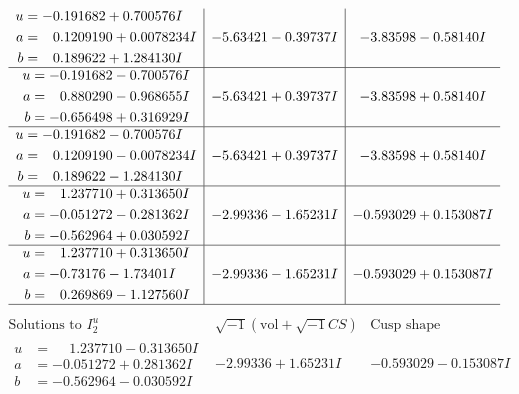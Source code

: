 \documentclass[1p]{elsarticle_modified}
\theoremstyle{definition}
\newcommand{\I}{\sqrt{-1}}
\begin{document}
$$\begin{array}{c|c|c}
\begin{aligned}
u &= -0.191682 + 0.700576 I \\
a &= \phantom{-}0.1209190 + 0.0078234 I \\
b &= \phantom{-}0.189622 + 1.284130 I\end{aligned}
 & -5.63421 - 0.39737 I & -3.83598 - 0.58140 I \\ \hline\begin{aligned}
u &= -0.191682 - 0.700576 I \\
a &= \phantom{-}0.880290 - 0.968655 I \\
b &= -0.656498 + 0.316929 I\end{aligned}
 & -5.63421 + 0.39737 I & -3.83598 + 0.58140 I \\ \hline\begin{aligned}
u &= -0.191682 - 0.700576 I \\
a &= \phantom{-}0.1209190 - 0.0078234 I \\
b &= \phantom{-}0.189622 - 1.284130 I\end{aligned}
 & -5.63421 + 0.39737 I & -3.83598 + 0.58140 I \\ \hline\begin{aligned}
u &= \phantom{-}1.237710 + 0.313650 I \\
a &= -0.051272 - 0.281362 I \\
b &= -0.562964 + 0.030592 I\end{aligned}
 & -2.99336 - 1.65231 I & -0.593029 + 0.153087 I \\ \hline\begin{aligned}
u &= \phantom{-}1.237710 + 0.313650 I \\
a &= -0.73176 - 1.73401 I \\
b &= \phantom{-}0.269869 - 1.127560 I\end{aligned}
 & -2.99336 - 1.65231 I & -0.593029 + 0.153087 I\\
 \hline 
 \end{array}$$\newpage$$\begin{array}{c|c|c}  
\text{Solutions to }I^u_{2}& \I (\text{vol} + \sqrt{-1}CS) & \text{Cusp shape}\\
 \hline 
\begin{aligned}
u &= \phantom{-}1.237710 - 0.313650 I \\
a &= -0.051272 + 0.281362 I \\
b &= -0.562964 - 0.030592 I\end{aligned}
 & -2.99336 + 1.65231 I & -0.593029 - 0.153087 I \\ \hline\begin{aligned}

\end{aligned}
\end{array}$$
\end{document}
